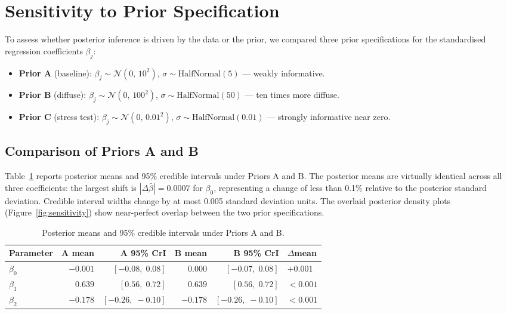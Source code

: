 \section{Sensitivity to Prior Specification}\label{sec:sensitivity}

To assess whether posterior inference is driven by the data or the
prior, we compared three prior specifications for the standardised
regression coefficients $\beta_j$:

\begin{itemize}
    \item \textbf{Prior A} (baseline): $\beta_j \sim \mathcal{N}(0,\,10^2)$,
          $\sigma \sim \text{HalfNormal}(5)$ --- weakly informative.
    \item \textbf{Prior B} (diffuse): $\beta_j \sim \mathcal{N}(0,\,100^2)$,
          $\sigma \sim \text{HalfNormal}(50)$ --- ten times more diffuse.
    \item \textbf{Prior C} (stress test): $\beta_j \sim \mathcal{N}(0,\,0.01^2)$,
          $\sigma \sim \text{HalfNormal}(0.01)$ --- strongly informative near zero.
\end{itemize}

\subsection{Comparison of Priors A and B}

Table~\ref{tab:sensitivity} reports posterior means and 95\% credible
intervals under Priors A and B. The posterior means are virtually
identical across all three coefficients: the largest shift is
$|\Delta\bar{\beta}| = 0.0007$ for $\beta_0$, representing a change of
less than 0.1\% relative to the posterior standard deviation.
Credible interval widths change by at most 0.005 standard deviation
units. The overlaid posterior density plots (Figure~\ref{fig:sensitivity})
show near-perfect overlap between the two prior specifications.

\begin{table}[htbp]
    \centering
    \caption{Posterior means and 95\% credible intervals under Priors A and B.}
    \label{tab:sensitivity}
    \begin{tabular}{lrrrrl}
        \hline
        Parameter & A mean & A 95\% CrI & B mean & B 95\% CrI & $\Delta$mean \\
        \hline
        $\beta_0$ & $-0.001$ & $[-0.08,\; 0.08]$ & $0.000$  & $[-0.07,\; 0.08]$ & $+0.001$ \\
        $\beta_1$ & $0.639$  & $[0.56,\; 0.72]$  & $0.639$  & $[0.56,\; 0.72]$  & $<0.001$ \\
        $\beta_2$ & $-0.178$ & $[-0.26,\; -0.10]$& $-0.178$ & $[-0.26,\; -0.10]$& $<0.001$ \\
        \hline
    \end{tabular}
\end{table}

